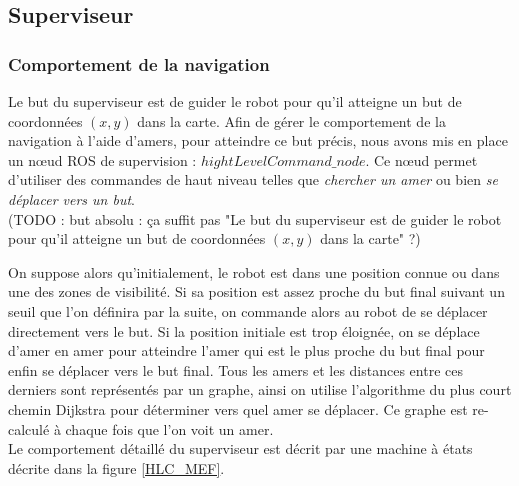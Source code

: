 \documentclass[10pt,a4paper]{article}
\begin{document}
\newpage
\subsection{Superviseur}
\label{sec:superviseur}

\subsubsection{Comportement de la navigation}

Le but du superviseur est de guider le robot pour qu'il atteigne un but de coordonnées $(x,y)$ dans la carte. Afin de gérer le comportement de la navigation à l'aide d'amers, pour atteindre ce but précis, nous avons mis en place un nœud ROS de supervision : $hightLevelCommand\_node$. Ce nœud permet d'utiliser des commandes de haut niveau telles que \textit{chercher un amer} ou bien \textit{se déplacer vers un but}.\\

(TODO : but absolu : ça suffit pas "Le but du superviseur est de guider le robot pour qu'il atteigne un but de coordonnées $(x,y)$ dans la carte" ?)

On suppose alors qu'initialement, le robot est dans une position connue ou dans une des zones de visibilité. Si sa position est assez proche du but final suivant un seuil que l'on définira par la suite, on commande alors au robot de se déplacer directement vers le but. Si la position initiale est trop éloignée, on se déplace d'amer en amer pour atteindre l'amer qui est le plus proche du but final pour enfin se déplacer vers le but final. Tous les amers et les distances entre ces derniers sont représentés par un graphe, ainsi on utilise l'algorithme du plus court chemin Dijkstra pour déterminer vers quel amer se déplacer. Ce graphe est re-calculé à chaque fois que l'on voit un amer.\\

Le comportement détaillé du superviseur est décrit par une machine à états décrite dans la figure \ref{HLC_MEF}.
\end{document}
